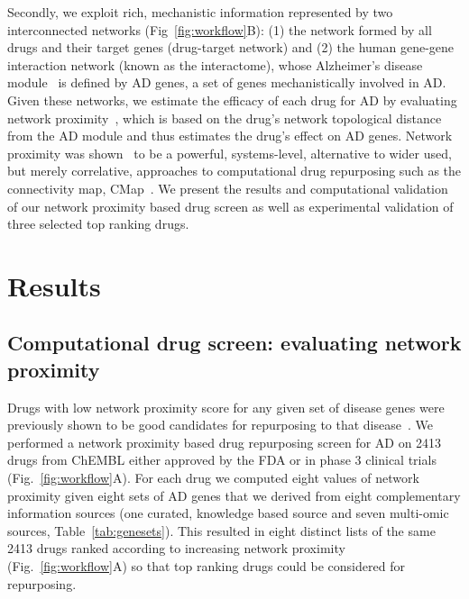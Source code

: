 \documentclass[letterpaper]{article}
\begin{document}
Secondly, we exploit rich, mechanistic information represented by two
interconnected networks (Fig~\ref{fig:workflow}B): (1) the network formed by
all drugs and their target genes (drug-target network) and (2) the human
gene-gene interaction network (known as the interactome), whose Alzheimer's
disease module~\citep{Barabasi2011} is defined by AD genes, a set of genes
mechanistically involved in AD.  Given these networks, we estimate the
efficacy of each drug for AD by evaluating network
proximity~\citep{Guney2016}, which is based on the drug's network topological
distance from the AD module and thus estimates the drug's effect on AD genes.
Network proximity was shown~\citep{Cheng2018} to be a powerful, systems-level,
alternative to wider used, but merely correlative, approaches to computational
drug repurposing such as the connectivity map, CMap~\citep{Lamb2006}.  We
present the results and computational validation of our network proximity
based drug screen as well as experimental validation of three selected top
ranking drugs.

\section{Results}

\subsection{Computational drug screen: evaluating network proximity}

Drugs with low network proximity score for any given set of disease genes were
previously shown to be good candidates for repurposing to that
disease~\citep{Cheng2018}.  We performed a network proximity based drug
repurposing screen for AD on 2413 drugs from ChEMBL either approved by the FDA
or in phase 3 clinical trials (Fig.~\ref{fig:workflow}A).  For each drug we
computed eight values of network proximity given eight sets of AD genes that
we derived from eight complementary information sources (one curated, knowledge
based source and seven multi-omic sources, Table~\ref{tab:genesets}).  This
resulted in eight distinct lists of the same 2413 drugs ranked according to
increasing network proximity (Fig.~\ref{fig:workflow}A) so that top ranking
drugs could be considered for repurposing.
\end{document}
